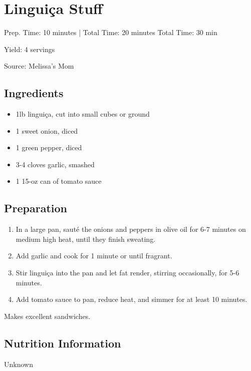 \section{Lingui\c{c}a Stuff}

\begin{center}
Prep. Time: 10 minutes |
Total Time: 20 minutes
Total Time: 30 min

  \noindent Yield: 4 servings

\vspace{1em}

  Source: Melissa's Mom
\end{center}

\subsection{Ingredients}
\begin{multicols}{2}
\begin{itemize}
  \item 1lb lingui\c{c}a, cut into small cubes or ground
  \item 1 sweet onion, diced
  \item 1 green pepper, diced
  \item 3-4 cloves garlic, smashed
  \item 1 15-oz can of tomato sauce
\end{itemize}
\end{multicols}

\subsection{Preparation}
\begin{enumerate}
  \item In a large pan, saut\'{e} the onions and peppers in olive oil for 6-7 minutes on medium high heat, until they finish sweating.
  \item Add garlic and cook for 1 minute or until fragrant.
  \item Stir lingui\c{c}a into the pan and let fat render, stirring occasionally, for 5-6 minutes.
  \item Add tomato sauce to pan, reduce heat, and simmer for at least 10 minutes.
\end{enumerate}
Makes excellent sandwiches.

\subsection{Nutrition Information}
Unknown

